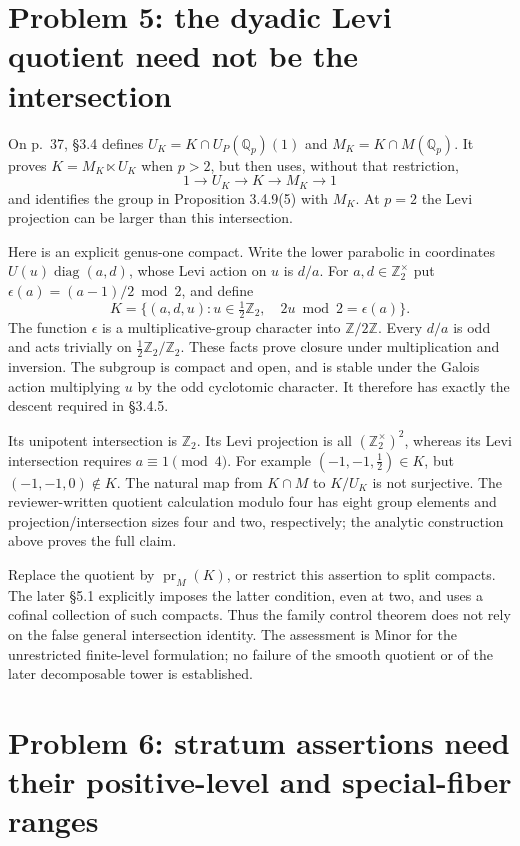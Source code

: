 \documentclass[10pt]{article}
\begin{document}
\section*{Problem 5: the dyadic Levi quotient need not be the intersection}
On p. 37, §3.4 defines \(U_K=K\cap U_P(\mathbb Q_p)(1)\) and \(M_K=K\cap M(\mathbb Q_p)\). It proves \(K=M_K\ltimes U_K\) when \(p>2\), but then uses, without that restriction, \[1\longrightarrow U_K\longrightarrow K\longrightarrow M_K\longrightarrow1\] and identifies the group in Proposition 3.4.9(5) with \(M_K\). At \(p=2\) the Levi projection can be larger than this intersection.\par
Here is an explicit genus-one compact. Write the lower parabolic in coordinates \(U(u)\operatorname{diag}(a,d)\), whose Levi action on \(u\) is \(d/a\). For \(a,d\in\mathbb Z_2^\times\) put \(\epsilon(a)=(a-1)/2\bmod2\), and define \[K=\{(a,d,u):u\in\tfrac12\mathbb Z_2,\quad 2u\bmod2=\epsilon(a)\}.\] The function \(\epsilon\) is a multiplicative-group character into \(\mathbb Z/2\mathbb Z\). Every \(d/a\) is odd and acts trivially on \(\tfrac12\mathbb Z_2/\mathbb Z_2\). These facts prove closure under multiplication and inversion. The subgroup is compact and open, and is stable under the Galois action multiplying \(u\) by the odd cyclotomic character. It therefore has exactly the descent required in §3.4.5.\par
Its unipotent intersection is \(\mathbb Z_2\). Its Levi projection is all \((\mathbb Z_2^\times)^2\), whereas its Levi intersection requires \(a\equiv1\pmod4\). For example \((-1,-1,\tfrac12)\in K\), but \((-1,-1,0)\notin K\). The natural map from \(K\cap M\) to \(K/U_K\) is not surjective. The reviewer-written quotient calculation modulo four has eight group elements and projection/intersection sizes four and two, respectively; the analytic construction above proves the full claim.\par
Replace the quotient by \(\operatorname{pr}_M(K)\), or restrict this assertion to split compacts. The later §5.1 explicitly imposes the latter condition, even at two, and uses a cofinal collection of such compacts. Thus the family control theorem does not rely on the false general intersection identity. The assessment is Minor for the unrestricted finite-level formulation; no failure of the smooth quotient or of the later decomposable tower is established.\par
\section*{Problem 6: stratum assertions need their positive-level and special-fiber ranges}
\end{document}
